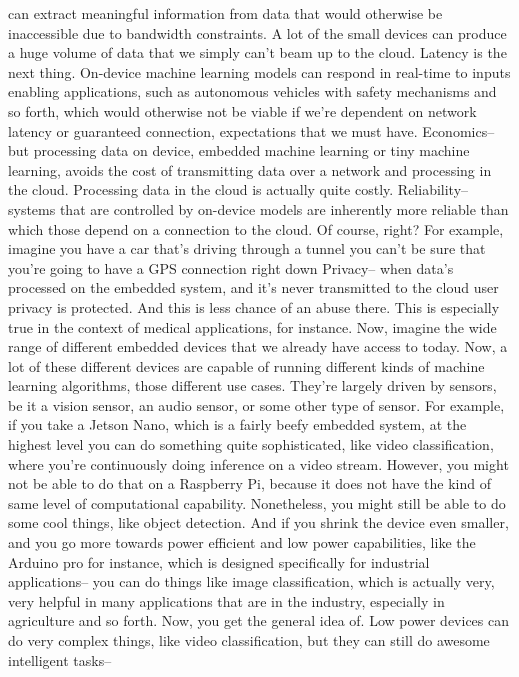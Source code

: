 can extract meaningful information from data
that would otherwise be inaccessible due to bandwidth constraints.
A lot of the small devices can produce a huge volume of data
that we simply can't beam up to the cloud.
Latency is the next thing.
On-device machine learning models can respond
in real-time to inputs enabling applications,
such as autonomous vehicles with safety mechanisms and so forth,
which would otherwise not be viable if we're
dependent on network latency or guaranteed connection, expectations
that we must have.
Economics-- but processing data on device,
embedded machine learning or tiny machine learning,
avoids the cost of transmitting data over a network
and processing in the cloud.
Processing data in the cloud is actually quite costly.
Reliability-- systems that are controlled by on-device models
are inherently more reliable than which those depend on a connection
to the cloud.
Of course, right?
For example, imagine you have a car that's
driving through a tunnel you can't be sure that you're going to have a GPS
connection right down Privacy--
when data's processed on the embedded system,
and it's never transmitted to the cloud user privacy is protected.
And this is less chance of an abuse there.
This is especially true in the context of medical applications, for instance.
Now, imagine the wide range of different embedded devices
that we already have access to today.
Now, a lot of these different devices are
capable of running different kinds of machine learning
algorithms, those different use cases.
They're largely driven by sensors, be it a vision sensor, an audio sensor,
or some other type of sensor.
For example, if you take a Jetson Nano, which
is a fairly beefy embedded system, at the highest level
you can do something quite sophisticated,
like video classification, where you're continuously
doing inference on a video stream.
However, you might not be able to do that on a Raspberry Pi,
because it does not have the kind of same level of computational capability.
Nonetheless, you might still be able to do some cool things,
like object detection.
And if you shrink the device even smaller,
and you go more towards power efficient and low power capabilities,
like the Arduino pro for instance, which is designed specifically
for industrial applications-- you can do things
like image classification, which is actually very, very
helpful in many applications that are in the industry, especially in agriculture
and so forth.
Now, you get the general idea of.
Low power devices can do very complex things, like video classification,
but they can still do awesome intelligent tasks--

